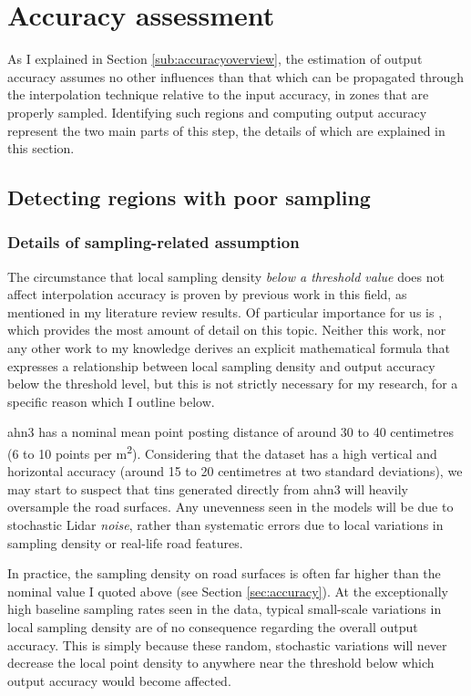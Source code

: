 \section{Accuracy assessment}
\label{sec:m_accuracyassessment}

As I explained in Section \ref{sub:accuracyoverview}, the estimation of output accuracy assumes no other influences than that which can be propagated through the interpolation technique relative to the input accuracy, in zones that are properly sampled. Identifying such regions and computing output accuracy represent the two main parts of this step, the details of which are explained in this section.

\subsection{Detecting regions with poor sampling}
\label{sub:m_accuracypoorsampling}

\subsubsection{Details of sampling-related assumption}

The circumstance that local sampling density \textit{below a threshold value} does not affect interpolation accuracy is proven by previous work in this field, as mentioned in my literature review results. Of particular importance for us is \cite{guo_etal_2010}, which provides the most amount of detail on this topic. Neither this work, nor any other work to my knowledge derives an explicit mathematical formula that expresses a relationship between local sampling density and output accuracy below the threshold level, but this is not strictly necessary for my research, for a specific reason which I outline below.

\ac{ahn3} has a nominal mean point posting distance of around 30 to 40 centimetres (6 to 10 points per m\textsuperscript{2}). Considering that the dataset has a high vertical and horizontal accuracy (around 15 to 20 centimetres at two standard deviations), we may start to suspect that \ac{tin}s generated directly from \ac{ahn3} will heavily oversample the road surfaces. Any unevenness seen in the models will be due to stochastic Lidar \textit{noise}, rather than systematic errors due to local variations in sampling density or real-life road features.

In practice, the sampling density on road surfaces is often far higher than the nominal value I quoted above (see Section \ref{sec:accuracy}). At the exceptionally high baseline sampling rates seen in the data, typical small-scale variations in local sampling density are of no consequence regarding the overall output accuracy. This is simply because these random, stochastic variations will never decrease the local point density to anywhere near the threshold below which output accuracy would become affected.

